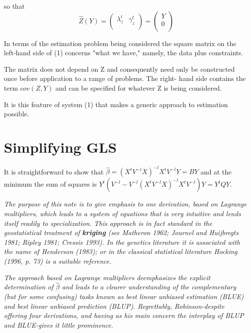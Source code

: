\documentclass[12pt, a4paper]{article}
\begin{document}
so that
\[ \hat{Z}(Y) =
\left(
\begin{array}{cc}
\lambda_{z}^{t}&
\gamma_z^{t} \\
\end{array}
\right)=\left(
\begin{array}{c}
Y \\
0 \\
\end{array}
\right) \]

In terms of the estimation problem being considered the square matrix on the left-hand side of (1) concerns "what we have," namely, the data plus constraints.

The matrix does not depend on Z and consequently need only be constructed once before application to a range of problems. The right- hand side contains the term $cov(Z,Y)$ and can be specified for whatever Z is being considered.

It is this feature of system (1) that makes a generic approach to estimation possible.


\section{Simplifying GLS}

It is straightforward to show that $\hat{\beta} = (X^tV^{-l}X)^{-l}X^tV^{-l}Y = BY$ and at the minimum the sum of squares is $Y^{t} (V^{-l}  - V^{-l}(X^tV^{-l}X)^{-l}X^tV^{-l})Y = Y^{t}QY$.\\
\bigskip

\emph{The purpose of this note is to give emphasis to one derivation, based on Lagrange multipliers, which leads to a system of equations that is very intuitive and lends itself readily to specialization. This approach is in fact standard in the geostatistical treatment of \textbf{kriging} (see Matheron 1962; Journel and Huijbregts 1981; Ripley 1981; Cressie 1993). In the genetics literature it is associated with the name of Henderson (1983); or in the classical statistical literature Hocking (1996, p. 73) is a suitable reference.}

\emph{The approach based on Lagrange multipliers deemphasizes the explicit determination of $\hat{\beta}$ and leads to a clearer understanding of the complementary (but for some confusing) tasks known as best linear unbiased estimation (BLUE) and best linear unbiased prediction (BLUP). Regrettably, Robinson-despite offering four derivations, and having as his main concern the interplay of BLUP and BLUE-gives it little prominence.}
\end{document}
